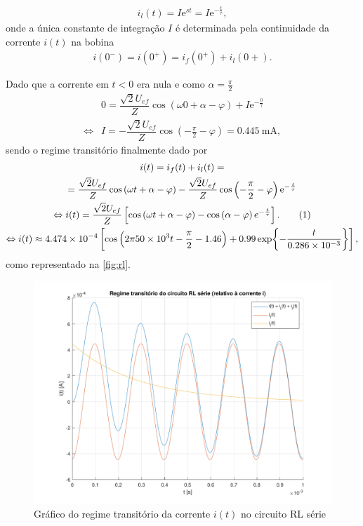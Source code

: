 \documentclass[a4paper, titlepage, portuguese]{article}
\newcommand{\eq}{\Leftrightarrow} %
\newcommand\numberthis{\addtocounter{equation}{1}\tag{\theequation}}
\newcommand\e{\mathrm{e} }
\begin{document}
		\begin{align*}
			i_l(t) = I \e^{st} = I \e^{-\frac{t}{\tau}},
		\end{align*}
		onde a única constante de integração $I$ é determinada pela continuidade da corrente $i(t)$ na bobina
		\begin{align*}
			i(0^-) = i(0^+) = i_f(0^+) + i_l(0+).
		\end{align*}
		\par
		Dado que a corrente em $t < 0$ era nula e como $\alpha = \frac{\pi}{2}$
		\begin{align*}
			&0 =  \dfrac{\sqrt{2}U_{ef}}{Z} \cos\left(\omega 0 + \alpha - \varphi\right) + I \e^{-\frac{0}{\tau}} \\ \eq
			&I = - \dfrac{\sqrt{2}U_{ef}}{Z} \cos\left(- \frac{\pi}{2} - \varphi\right) = \SI{0.445}{\milli\ampere},
		\end{align*}
		sendo o regime transitório finalmente dado por
		\begin{gather*}
			i(t) = i_f(t) + i_l(t) = \\ =
			\dfrac{\sqrt{2}U_{ef}}{Z} \cos\left(\omega t + \alpha - \varphi\right) - \dfrac{\sqrt{2}U_{ef}}{Z} \cos\left(- \frac{\pi}{2} - \varphi\right) \e^{-\frac{t}{\tau}} \\ \eq
			i(t) = \dfrac{\sqrt{2}U_{ef}}{Z} \left[ \cos\left(\omega t + \alpha - \varphi\right) - \cos\left(\alpha - \varphi\right)e^{-\frac{t}{\tau}}\right] . \numberthis \label{eq:trans_RL_sol} \\ \eq
			i(t) \approx \num{4.474e-4} \left[ \cos\left(2\pi\num{50e3}t - \frac{\pi}{2} - 1.46\right) + 0.99\exp{-\frac{t}{\num{0.286e-3}}}\right],
		\end{gather*}
		como representado na \autoref{fig:rl}.

		\begin{figure}[H]
			\centering
			\includegraphics[width=1.0\linewidth]{rl.pdf}
			\caption{Gráfico do regime transitório da corrente $i(t)$ no circuito RL série}
			\label{fig:rl}
		\end{figure}
\end{document}
